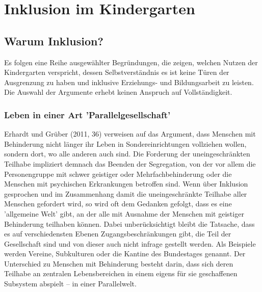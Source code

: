 \chapter{Inklusion im Kindergarten}

\section{Warum Inklusion?}
\label{sec:Why}
Es folgen eine Reihe ausgewählter Begründungen, die zeigen, welchen Nutzen der Kindergarten verspricht, dessen Selbstverständnis es ist keine Türen der Ausgrenzung zu haben und inklusive Erziehungs- und Bildungsarbeit zu leisten. Die Auswahl der Argumente erhebt keinen Anspruch auf Vollständigkeit.

\subsection{Leben in einer Art 'Parallelgesellschaft'}
Erhardt und Grüber (2011, 36) verweisen auf das Argument, dass Menschen mit Behinderung nicht länger ihr Leben in Sondereinrichtungen vollziehen wollen, sondern dort, wo alle anderen auch sind. Die Forderung der uneingeschränkten Teilhabe impliziert demnach das Beenden der Segregation, von der vor allem die Personengruppe mit schwer geistiger oder Mehrfachbehinderung oder die Menschen mit psychischen Erkrankungen betroffen sind. Wenn über Inklusion gesprochen und im Zusammenhang damit die uneingeschränkte Teilhabe aller Menschen gefordert wird, so wird oft dem Gedanken gefolgt, dass es eine 'allgemeine Welt' gibt, an der alle mit Ausnahme der Menschen mit geistiger Behinderung teilhaben können. Dabei unberücksichtigt bleibt die Tatsache, dass es auf verschiedensten Ebenen Zugangsbeschränkungen gibt, die Teil der Gesellschaft sind und von dieser auch nicht infrage gestellt werden. Als Beispiele werden Vereine, Subkulturen oder die Kantine des Bundestages genannt. Der Unterschied zu Menschen mit Behinderung besteht darin, dass sich deren Teilhabe an zentralen Lebensbereichen in einem eigens für sie geschaffenen Subsystem abspielt -- in einer Parallelwelt.
